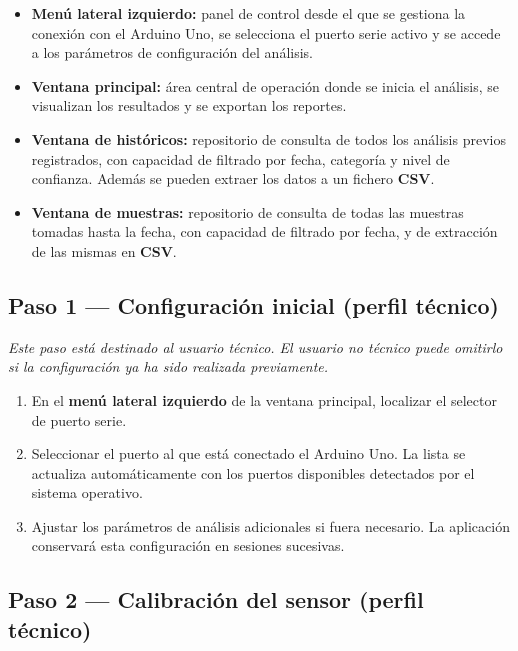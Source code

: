 \begin{itemize}
    \item \textbf{Menú lateral izquierdo:} panel de control desde el que se
    gestiona la conexión con el Arduino Uno, se selecciona el puerto serie
    activo y se accede a los parámetros de configuración del análisis.
    \item \textbf{Ventana principal:} área central de operación donde se
    inicia el análisis, se visualizan los resultados y se exportan los reportes.
    \item \textbf{Ventana de históricos:} repositorio de consulta de todos los
    análisis previos registrados, con capacidad de filtrado por fecha,
    categoría y nivel de confianza. Además se pueden extraer los datos a un fichero \textbf{CSV}.
    \item \textbf{Ventana de muestras:} repositorio de consulta de todas las muestras tomadas hasta la fecha, con capacidad de filtrado por fecha, y de extracción de las mismas en \textbf{CSV}.
\end{itemize}

\subsection*{Paso 1 — Configuración inicial (perfil técnico)}

\textit{Este paso está destinado al usuario técnico. El usuario no técnico
puede omitirlo si la configuración ya ha sido realizada previamente.}

\begin{enumerate}
    \item En el \textbf{menú lateral izquierdo} de la ventana principal,
    localizar el selector de puerto serie.
    \item Seleccionar el puerto al que está conectado el Arduino Uno. La lista
    se actualiza automáticamente con los puertos disponibles detectados por
    el sistema operativo.
    \item Ajustar los parámetros de análisis adicionales si fuera necesario.
    La aplicación conservará esta configuración en sesiones sucesivas.
\end{enumerate}


\subsection*{Paso 2 — Calibración del sensor (perfil técnico)}

